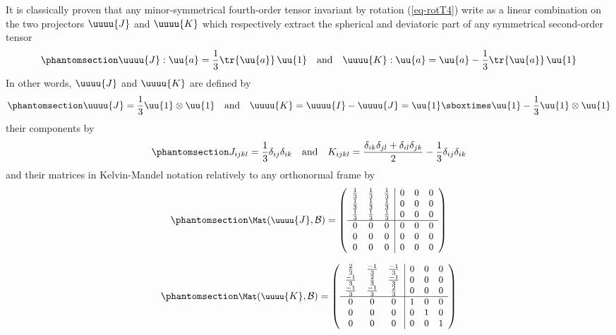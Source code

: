 \documentclass[
  letterpaper,
  DIV=11,
  numbers=noendperiod]{scrreprt}
\begin{document}
It is classically proven that any minor-symmetrical fourth-order tensor
invariant by rotation (\ref{eq-rotT4}) write as a linear combination on
the two projectors \(\uuuu{J}\) and \(\uuuu{K}\) which respectively
extract the spherical and deviatoric part of any symmetrical
second-order tensor \begin{equation}\phantomsection\label{eq-JKext}{
\uuuu{J}:\uu{a}=\frac{1}{3}\tr{\uu{a}}\,\uu{1}
\quad \textrm{and} \quad
\uuuu{K}:\uu{a}=\uu{a}-\frac{1}{3}\tr{\uu{a}}\,\uu{1}
}\end{equation} In other words, \(\uuuu{J}\) and \(\uuuu{K}\) are
defined by \begin{equation}\phantomsection\label{eq-JK}{
\uuuu{J}=\frac{1}{3}\uu{1}\otimes\uu{1}
\quad \textrm{and} \quad
\uuuu{K}=\uuuu{I}-\uuuu{J}=\uu{1}\sboxtimes\uu{1}-\frac{1}{3}\uu{1}\otimes\uu{1}
}\end{equation} their components by
\begin{equation}\phantomsection\label{eq-JKijkl}{
J_{ijkl}=\frac{1}{3}\delta_{ij}\delta_{ik}
\quad \textrm{and} \quad
K_{ijkl}=\frac{\delta_{ik}\delta_{jl}+\delta_{il}\delta_{jk}}{2}-\frac{1}{3}\delta_{ij}\delta_{ik}
}\end{equation} and their matrices in Kelvin-Mandel notation relatively
to any orthonormal frame by
\begin{equation}\phantomsection\label{eq-matJ}{
\small
\Mat(\uuuu{J},\mathcal{B})=
   \left(
   \begin{array}{ccc|ccc}
   \frac{1}{3} & \frac{1}{3} & \frac{1}{3} & 0 & 0 & 0 \\
   \frac{1}{3} & \frac{1}{3} & \frac{1}{3} & 0 & 0 & 0 \\
   \frac{1}{3} & \frac{1}{3} & \frac{1}{3} & 0 & 0 & 0 \\
   \hline
   0 & 0 & 0 & 0 & 0 & 0 \\
   0 & 0 & 0 & 0 & 0 & 0 \\
   0 & 0 & 0 & 0 & 0 & 0 \\
   \end{array}
   \right)
}\end{equation}

\begin{equation}\phantomsection\label{eq-matK}{
\small
\Mat(\uuuu{K},\mathcal{B})=
   \left(
   \begin{array}{ccc|ccc}
   \frac{2}{3} & \frac{-1}{3} & \frac{-1}{3} & 0 & 0 & 0 \\
   \frac{-1}{3} & \frac{2}{3} & \frac{-1}{3} & 0 & 0 & 0 \\
   \frac{-1}{3} & \frac{-1}{3} & \frac{2}{3} & 0 & 0 & 0 \\
   \hline
   0 & 0 & 0 & 1 & 0 & 0 \\
   0 & 0 & 0 & 0 & 1 & 0 \\
   0 & 0 & 0 & 0 & 0 & 1 \\
   \end{array}
   \right)
}\end{equation}
\end{document}
